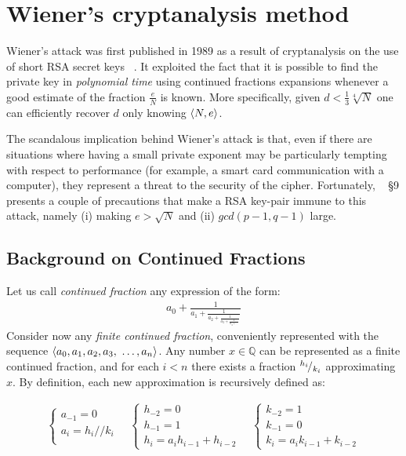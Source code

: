 \chapter{Wiener's cryptanalysis method \label{chap:wiener}}

Wiener's attack was first published in 1989 as a result of cryptanalysis on the
use of short RSA secret keys ~\cite{wiener}. It exploited the fact that it is
possible to find the private key in \emph{polynomial time} using continued fractions
expansions whenever a good estimate of the fraction $\frac{e}{N}$ is known.
More specifically, given $d < \frac{1}{3} \sqrt[4]{N}$ one can efficiently
recover $d$ only knowing $\langle N, e\rangle$.

The scandalous implication behind Wiener's attack is that, even if there are
situations where having a small private exponent may be
particularly tempting with respect to performance (for example, a smart card
communication with a computer), they represent a threat to the security of the
cipher.
Fortunately, ~\cite{wiener} \S 9 presents a couple of precautions that make a
RSA key-pair immune to this attack, namely
(i) making $e > \sqrt{N}$ and
(ii) $gcd(p-1, q-1)$ large.

\section{Background on Continued Fractions \label{sec:wiener:cf}}

Let us call \emph{continued fraction} any expression of the form:
\begin{align*}
a_0 + \frac{1}{a_1
    + \frac{1}{a_2
    + \frac{1}{a_3
    + \frac{1}{a_4 + \ldots}}}}
\end{align*}
Consider now any \emph{finite continued fraction}, conveniently represented with
the sequence
$\angular{a_0, a_1, a_2, a_3,  \ \ldots, a_n}$.
Any number $x \in \mathbb{Q}$ can be represented as a finite continued fraction,
and for each $i < n$ there exists a fraction ${}^{h_i}\!/_{k_i}$ approximating
$x$.
By definition, each new approximation is recursively defined as:

\begin{align}
  \label{eq:wiener:cf}
  \begin{cases}
    a_{-1} = 0 \\
    a_i = h_i // k_i \\
  \end{cases}
  \quad
  \begin{cases}
    h_{-2} = 0 \\
    h_{-1} = 1 \\
    h_i = a_i h_{i-1} + h_{i-2}
  \end{cases}
  \quad
  \begin{cases}
    k_{-2} = 1 \\
    k_{-1} = 0  \\
    k_i = a_i k_{i-1} + k_{i-2}
  \end{cases}
\end{align}

